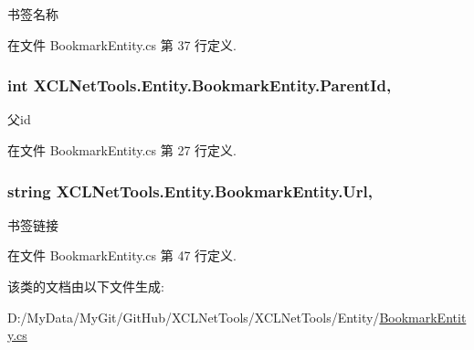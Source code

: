 书签名称 



在文件 Bookmark\-Entity.\-cs 第 37 行定义.

\hypertarget{class_x_c_l_net_tools_1_1_entity_1_1_bookmark_entity_afd3c2002aa8d5edeac06f6ef32ba7454}{
\subsubsection[{Parent\-Id}]{\setlength{\rightskip}{0pt plus 5cm}int X\-C\-L\-Net\-Tools.\-Entity.\-Bookmark\-Entity.\-Parent\-Id\hspace{0.3cm}{\ttfamily [get]}, {\ttfamily [set]}}}\label{class_x_c_l_net_tools_1_1_entity_1_1_bookmark_entity_afd3c2002aa8d5edeac06f6ef32ba7454}


父id 



在文件 Bookmark\-Entity.\-cs 第 27 行定义.

\hypertarget{class_x_c_l_net_tools_1_1_entity_1_1_bookmark_entity_a88ebfe2441fd5804a82f5eaee1ce3232}{
\subsubsection[{Url}]{\setlength{\rightskip}{0pt plus 5cm}string X\-C\-L\-Net\-Tools.\-Entity.\-Bookmark\-Entity.\-Url\hspace{0.3cm}{\ttfamily [get]}, {\ttfamily [set]}}}\label{class_x_c_l_net_tools_1_1_entity_1_1_bookmark_entity_a88ebfe2441fd5804a82f5eaee1ce3232}


书签链接 



在文件 Bookmark\-Entity.\-cs 第 47 行定义.



该类的文档由以下文件生成\-:\begin{DoxyCompactItemize}
\item 
D\-:/\-My\-Data/\-My\-Git/\-Git\-Hub/\-X\-C\-L\-Net\-Tools/\-X\-C\-L\-Net\-Tools/\-Entity/\hyperlink{_bookmark_entity_8cs}{Bookmark\-Entity.\-cs}\end{DoxyCompactItemize}
